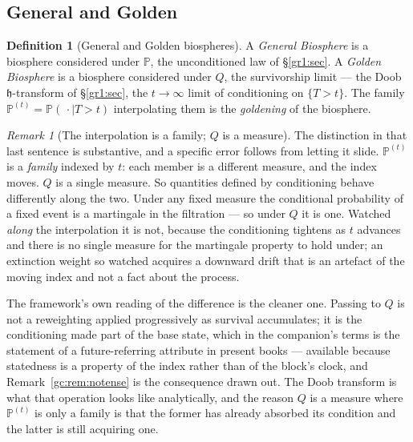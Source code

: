 \documentclass[11pt]{article}
\numberwithin{equation}{section}
\theoremstyle{plain}
\theoremstyle{definition}
\newtheorem{definition}[theorem]{Definition}
\theoremstyle{remark}
\newtheorem{remark}[theorem]{Remark}
\newcommand{\PP}{\mathbb{P}}
\newcommand{\hm}{\mathfrak{h}}
\begin{document}
\subsection{General and Golden}\label{gr:sub:generalgolden}

\begin{definition}[General and Golden biospheres]\label{gr:def:gg}
A \emph{General Biosphere} is a biosphere considered under $\PP$, the
unconditioned law of \S\ref{gr1:sec}. A \emph{Golden Biosphere} is a biosphere
considered under $Q$, the survivorship limit --- the Doob $\hm$-transform
of \S\ref{gr1:sec}, the $t\to\infty$ limit of conditioning on $\{T>t\}$. The
family $\PP^{(t)}=\PP(\,\cdot\mid T>t)$ interpolating them is the
\emph{goldening} of the biosphere.
\end{definition}

\begin{remark}[The interpolation is a family; $Q$ is a measure]
\label{gr:rem:familyvsmeasure}
The distinction in that last sentence is substantive, and a specific
error follows from letting it slide. $\PP^{(t)}$ is a \emph{family}
indexed by $t$: each member is a different measure, and the index moves.
$Q$ is a single measure. So quantities defined by conditioning behave
differently along the two. Under any fixed measure the conditional
probability of a fixed event is a martingale in the filtration --- so
under $Q$ it is one. Watched \emph{along} the interpolation it is not,
because the conditioning tightens as $t$ advances and there is no single
measure for the martingale property to hold under; an extinction weight
so watched acquires a downward drift that is an artefact of the moving
index and not a fact about the process.

The framework's own reading of the difference is the cleaner one. Passing
to $Q$ is not a reweighting applied progressively as survival
accumulates; it is the conditioning made part of the base state, which in
the companion's terms is the statement of a future-referring attribute in
present books \cite{Aethus} --- available because statedness is a
property of the index rather than of the block's clock, and
Remark~\ref{gc:rem:notense} is the consequence drawn out. The Doob transform is what that operation looks like
analytically, and the reason $Q$ is a measure where $\PP^{(t)}$ is only a
family is that the former has already absorbed its condition and the
latter is still acquiring one.
\end{remark}
\end{document}
